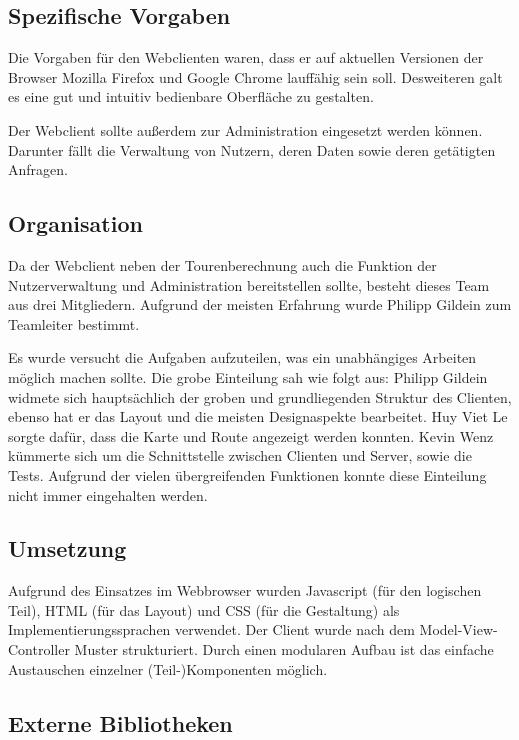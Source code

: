 \subsection*{Spezifische Vorgaben}

Die Vorgaben für den Webclienten waren, dass er auf aktuellen Versionen der Browser Mozilla Firefox und Google Chrome lauffähig sein soll.
Desweiteren galt es eine gut und intuitiv bedienbare Oberfläche zu gestalten.

Der Webclient sollte außerdem zur Administration eingesetzt werden können.
Darunter fällt die Verwaltung von Nutzern, deren Daten sowie deren getätigten Anfragen.

\subsection*{Organisation}

Da der Webclient neben der Tourenberechnung auch die Funktion der Nutzerverwaltung und Administration bereitstellen sollte, besteht dieses Team  aus drei Mitgliedern. 
Aufgrund der meisten Erfahrung wurde Philipp Gildein zum Teamleiter bestimmt.

Es wurde versucht die Aufgaben aufzuteilen, was ein unabhängiges Arbeiten möglich machen sollte.
Die grobe Einteilung sah wie folgt aus: Philipp Gildein widmete sich hauptsächlich der groben und grundliegenden Struktur des Clienten, ebenso hat er das Layout und die meisten Designaspekte bearbeitet.
Huy Viet Le sorgte dafür, dass die Karte und Route angezeigt werden konnten.
Kevin Wenz kümmerte sich um die Schnittstelle zwischen Clienten und Server, sowie die Tests.
Aufgrund der vielen übergreifenden Funktionen konnte diese Einteilung nicht immer eingehalten werden.

\subsection*{Umsetzung}

Aufgrund des Einsatzes im Webbrowser wurden Javascript (für den logischen Teil), HTML (für das Layout) und CSS (für die Gestaltung) als Implementierungssprachen verwendet.
Der Client wurde nach dem Model-View-Controller Muster strukturiert. 
Durch einen modularen Aufbau ist das einfache Austauschen einzelner (Teil-)Komponenten möglich.

\subsection*{Externe Bibliotheken}

